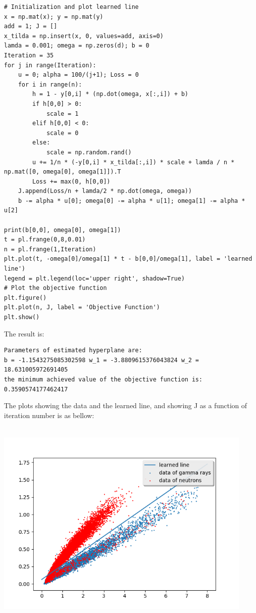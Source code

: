 \documentclass[letterpaper,11pt]{article}
\begin{document}
\begin{spacing}{1.2}
\begin{lstlisting}
# Initialization and plot learned line
x = np.mat(x); y = np.mat(y)
add = 1; J = []
x_tilda = np.insert(x, 0, values=add, axis=0)
lamda = 0.001; omega = np.zeros(d); b = 0
Iteration = 35
for j in range(Iteration):
    u = 0; alpha = 100/(j+1); Loss = 0
    for i in range(n):
        h = 1 - y[0,i] * (np.dot(omega, x[:,i]) + b)
        if h[0,0] > 0:
            scale = 1
        elif h[0,0] < 0:
            scale = 0
        else:
            scale = np.random.rand()
        u += 1/n * (-y[0,i] * x_tilda[:,i]) * scale + lamda / n * np.mat([0, omega[0], omega[1]]).T
        Loss += max(0, h[0,0])
    J.append(Loss/n + lamda/2 * np.dot(omega, omega))
    b -= alpha * u[0]; omega[0] -= alpha * u[1]; omega[1] -= alpha * u[2]

print(b[0,0], omega[0], omega[1])
t = pl.frange(0,8,0.01)
n = pl.frange(1,Iteration)
plt.plot(t, -omega[0]/omega[1] * t - b[0,0]/omega[1], label = 'learned line')
legend = plt.legend(loc='upper right', shadow=True)
# Plot the objective function
plt.figure()
plt.plot(n, J, label = 'Objective Function')
plt.show()
\end{lstlisting}
The result is:
\begin{lstlisting}
Parameters of estimated hyperplane are:
b = -1.1543275085302598 w_1 = -3.8809615376043824 w_2 = 18.631005972691405
the minimum achieved value of the objective function is: 0.3590574177462417
\end{lstlisting}
The plots showing the data and the learned line, and showing J as a function of iteration number is as bellow:

\includegraphics[width=4.95in,height=4.05in]{sg_opt_smh.png}


\end{spacing}
\end{document}
